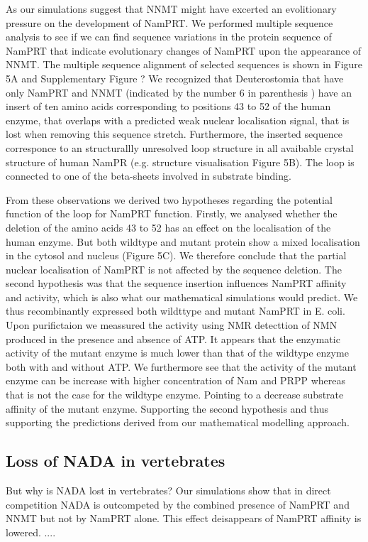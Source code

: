 As our simulations suggest that NNMT might have excerted an evolitionary pressure on the development of NamPRT. We performed multiple sequence analysis to see if we can find sequence variations in the protein sequence of NamPRT that indicate evolutionary changes of NamPRT upon the appearance of NNMT. The multiple sequence alignment of selected sequences is shown in Figure 5A and Supplementary Figure ? We recognized that Deuterostomia that have only NamPRT and NNMT (indicated by the number 6 in parenthesis ) have an insert of ten amino acids corresponding to positions 43 to 52 of the human enzyme, that overlaps with a predicted weak nuclear localisation signal, that is lost when removing this sequence stretch. 
Furthermore, the inserted sequence corresponce to an structurallly unresolved loop structure in all avaibable crystal structure of human NamPR (e.g. \cite{Wang2006} structure visualisation Figure 5B). The loop is connected to one of the beta-sheets involved in substrate binding. 

From these observations we derived two hypotheses regarding the potential function of the loop for NamPRT function. Firstly, we analysed whether the deletion of the amino acids 43 to 52 has an effect on the localisation of the human enzyme. But both wildtype and mutant protein show a mixed localisation in the cytosol and nucleus (Figure 5C). We therefore conclude that the partial nuclear localisation of NamPRT is not affected by the sequence deletion. 
The second hypothesis was that the sequence insertion influences NamPRT affinity and activity, which is also what our mathematical simulations would predict. We thus recombinantly expressed  both wildttype and mutant  NamPRT  in E. coli.  Upon purifictaion we meassured the activity using NMR detecttion of NMN produced in the presence and absence of ATP. It appears that the enzymatic activity of the mutant enzyme is much lower than that of the wildtype enzyme both with and without ATP. We furthermore see that the activity of the mutant enzyme can be increase with higher concentration of Nam and PRPP whereas that is not the case for the wildtype enzyme. Pointing to a decrease substrate affinity of the mutant enzyme. Supporting the second hypothesis and thus supporting the predictions derived from our mathematical modelling approach.

\subsection{Loss of NADA in vertebrates}

But why is NADA lost in vertebrates? Our simulations show that in direct competition NADA is outcompeted by the combined presence of NamPRT and NNMT but not by NamPRT alone. This effect deisappears of NamPRT affinity is lowered. ....